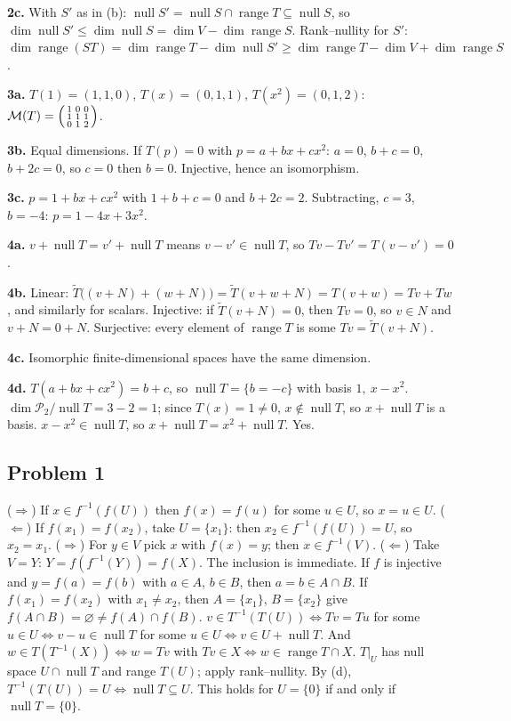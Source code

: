 \documentclass[11pt]{scrartcl}
\DeclareMathOperator{\nul}{null}
\DeclareMathOperator{\range}{range}
\newcommand{\PP}{\mathcal P}
\newcommand{\MM}{\mathcal M}
\begin{document}
\textbf{2c.} With $S'$ as in (b): $\nul S'=\nul S\cap\range T\subseteq\nul S$, so $\dim\nul S'\le\dim\nul S=\dim V-\dim\range S$.
Rank--nullity for $S'$: $\dim\range(ST)=\dim\range T-\dim\nul S'\ge\dim\range T-\dim V+\dim\range S$.

\textbf{3a.} $T(1)=(1,1,0)$, $T(x)=(0,1,1)$, $T(x^2)=(0,1,2)$:
$\MM(T)=\begin{psmallmatrix}1&0&0\\1&1&1\\0&1&2\end{psmallmatrix}$.

\textbf{3b.} Equal dimensions. If $T(p)=0$ with $p=a+bx+cx^2$: $a=0$, $b+c=0$, $b+2c=0$, so $c=0$ then $b=0$. Injective, hence an isomorphism.

\textbf{3c.} $p=1+bx+cx^2$ with $1+b+c=0$ and $b+2c=2$. Subtracting, $c=3$, $b=-4$: $p=1-4x+3x^2$.

\textbf{4a.} $v+\nul T=v'+\nul T$ means $v-v'\in\nul T$, so $Tv-Tv'=T(v-v')=0$.

\textbf{4b.} Linear: $\tilde T\big((v+N)+(w+N)\big)=\tilde T(v+w+N)=T(v+w)=Tv+Tw$, and similarly for scalars.
Injective: if $\tilde T(v+N)=0$, then $Tv=0$, so $v\in N$ and $v+N=0+N$.
Surjective: every element of $\range T$ is some $Tv=\tilde T(v+N)$.

\textbf{4c.} Isomorphic finite-dimensional spaces have the same dimension.

\textbf{4d.} $T(a+bx+cx^2)=b+c$, so $\nul T=\{b=-c\}$ with basis $1,\ x-x^2$.
$\dim\PP_2/\nul T=3-2=1$; since $T(x)=1\ne0$, $x\notin\nul T$, so $x+\nul T$ is a basis.
$x-x^2\in\nul T$, so $x+\nul T=x^2+\nul T$. Yes.

\subsection*{Problem 1}
\begin{enumerate}[(a)]
  \ii ($\Rightarrow$) If $x\in f^{-1}(f(U))$ then $f(x)=f(u)$ for some $u\in U$, so $x=u\in U$.
  ($\Leftarrow$) If $f(x_1)=f(x_2)$, take $U=\{x_1\}$: then $x_2\in f^{-1}(f(U))=U$, so $x_2=x_1$.
  \ii ($\Rightarrow$) For $y\in V$ pick $x$ with $f(x)=y$; then $x\in f^{-1}(V)$.
  ($\Leftarrow$) Take $V=Y$: $Y=f(f^{-1}(Y))=f(X)$.
  \ii The inclusion is immediate.
  If $f$ is injective and $y=f(a)=f(b)$ with $a\in A$, $b\in B$, then $a=b\in A\cap B$.
  If $f(x_1)=f(x_2)$ with $x_1\ne x_2$, then $A=\{x_1\}$, $B=\{x_2\}$ give $f(A\cap B)=\varnothing\ne f(A)\cap f(B)$.
  \ii $v\in T^{-1}(T(U))\iff Tv=Tu$ for some $u\in U\iff v-u\in\nul T$ for some $u\in U\iff v\in U+\nul T$.
  And $w\in T(T^{-1}(X))\iff w=Tv$ with $Tv\in X\iff w\in\range T\cap X$.
  \ii $T|_U$ has null space $U\cap\nul T$ and range $T(U)$; apply rank--nullity.
  By (d), $T^{-1}(T(U))=U\iff\nul T\subseteq U$.
  This holds for $U=\{0\}$ if and only if $\nul T=\{0\}$.
\end{enumerate}
\end{document}
